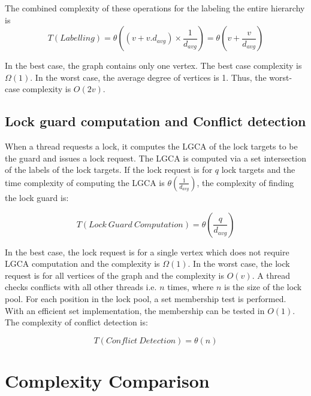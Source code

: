 The combined complexity of these operations for the labeling the entire hierarchy is 
\begin{equation*}
T(Labelling) = 	\theta((v + v.d_{avg}) \times {\frac{1}{d_{avg}}}) = \theta(v+ \frac{v}{d_{avg}})
\end{equation*}


In the best case, the graph contains only one vertex. The best case complexity is $\Omega(1)$.
In the worst case, the average degree of vertices is 1. Thus, the worst-case complexity is $O(2v)$.


\subsection{Lock guard computation and Conflict detection}

When a thread requests a lock, it computes the LGCA of the lock targets to be the guard and issues a lock request. 
The LGCA is computed via a set intersection of the labels of the lock targets. 
If the lock request is for $q$ lock targets and the time complexity of computing the LGCA is $\theta(\frac{1}{d_{avg}})$, the complexity of finding the lock guard is:

\begin{equation*}
	T(Lock~Guard~Computation) = \theta(\frac{q}{d_{avg}})
\end{equation*}



In the best case, the lock request is for a single vertex which does not require LGCA computation and the complexity is $\Omega(1)$. In the worst case, the lock request is for all vertices of the graph and the complexity is $O(v)$. A thread checks conflicts with all other threads i.e. $n$ times, where $n$ is the size of the lock pool. For each position in the lock pool, a set membership test is performed. With an efficient set implementation, the membership can be tested in $O(1)$. The complexity of conflict detection is:
 
 \begin{equation*}
	 	T(Conflict~Detection) = \theta(n)
 \end{equation*}


\section{Complexity Comparison}

